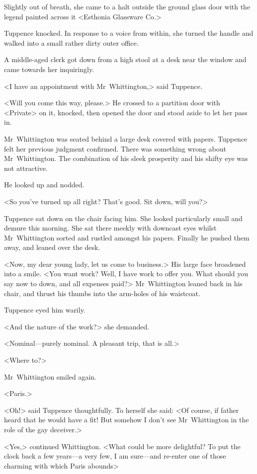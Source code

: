 Slightly out of breath, she came to a halt outside the ground glass door with the legend painted across it <Esthonia Glassware Co.>

Tuppence knocked. In response to a voice from within, she turned the handle and walked into a small rather dirty outer office.

A middle-aged clerk got down from a high stool at a desk near the window and came towards her inquiringly.

<I have an appointment with Mr~Whittington,> said Tuppence.

<Will you come this way, please.> He crossed to a partition door with <Private> on it, knocked, then opened the door and stood aside to let her pass in.

Mr~Whittington was seated behind a large desk covered with papers. Tuppence felt her previous judgment confirmed. There was something wrong about Mr~Whittington. The combination of his sleek prosperity and his shifty eye was not attractive.

He looked up and nodded.

<So you've turned up all right? That's good. Sit down, will you?>

Tuppence sat down on the chair facing him. She looked particularly small and demure this morning. She sat there meekly with downcast eyes whilst Mr~Whittington sorted and rustled amongst his papers. Finally he pushed them away, and leaned over the desk.

<Now, my dear young lady, let us come to business.> His large face broadened into a smile. <You want work? Well, I have work to offer you. What should you say now to  down, and all expenses paid?> Mr~Whittington leaned back in his chair, and thrust his thumbs into the arm-holes of his waistcoat.

Tuppence eyed him warily.

<And the nature of the work?> she demanded.

<Nominal—purely nominal. A pleasant trip, that is all.>

<Where to?>

Mr~Whittington smiled again.

<Paris.>

<Oh!> said Tuppence thoughtfully. To herself she said: <Of course, if father heard that he would have a fit! But somehow I don't see Mr~Whittington in the role of the gay deceiver.>

<Yes,> continued Whittington. <What could be more delightful? To put the clock back a few years—a very few, I am sure—and re-enter one of those charming  with which Paris abounds\longdash>

